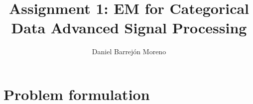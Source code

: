 \documentclass[12pt]{article}
\begin{document}
 
 
 
\title{Assignment 1: EM for Categorical Data Advanced Signal Processing}%
\author{Daniel Barrejón Moreno} %
 
\maketitle
 
\section{Problem formulation}
 
\end{document}
